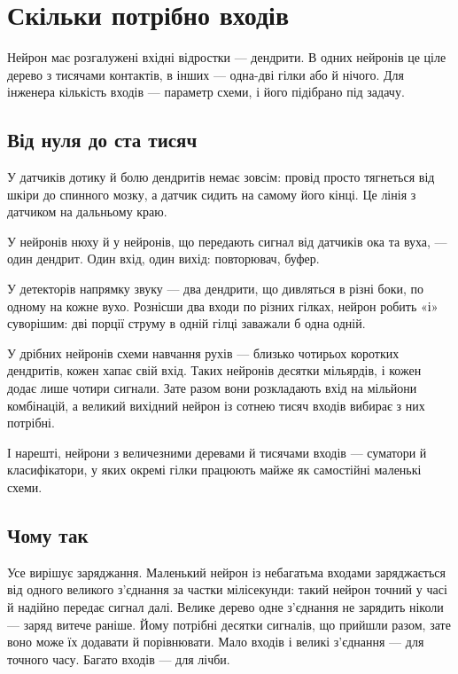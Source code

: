 \chapter{Скільки потрібно входів}

Нейрон має розгалужені вхідні відростки --- дендрити. В одних нейронів це ціле дерево з тисячами контактів, в інших --- одна-дві гілки або й нічого. Для інженера кількість входів --- параметр схеми, і його підібрано під задачу.

\section*{Від нуля до ста тисяч}

У датчиків дотику й болю дендритів немає зовсім: провід просто тягнеться від шкіри до спинного мозку, а датчик сидить на самому його кінці. Це лінія з датчиком на дальньому краю.


У нейронів нюху й у нейронів, що передають сигнал від датчиків ока та вуха, --- один дендрит. Один вхід, один вихід: повторювач, буфер.

У детекторів напрямку звуку --- два дендрити, що дивляться в різні боки, по одному на кожне вухо. Рознісши два входи по різних гілках, нейрон робить «і» суворішим: дві порції струму в одній гілці заважали б одна одній.

У дрібних нейронів схеми навчання рухів --- близько чотирьох коротких дендритів, кожен хапає свій вхід. Таких нейронів десятки мільярдів, і кожен додає лише чотири сигнали. Зате разом вони розкладають вхід на мільйони комбінацій, а великий вихідний нейрон із сотнею тисяч входів вибирає з них потрібні.

І нарешті, нейрони з величезними деревами й тисячами входів --- суматори й класифікатори, у яких окремі гілки працюють майже як самостійні маленькі схеми.

\section*{Чому так}

Усе вирішує заряджання. Маленький нейрон із небагатьма входами заряджається від одного великого з'єднання за частки мілісекунди: такий нейрон точний у часі й надійно передає сигнал далі. Велике дерево одне з'єднання не зарядить ніколи --- заряд витече раніше. Йому потрібні десятки сигналів, що прийшли разом, зате воно може їх додавати й порівнювати. Мало входів і великі з'єднання --- для точного часу. Багато входів --- для лічби.

